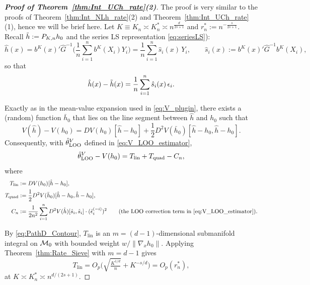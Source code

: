 \documentclass[12pt,american]{article}
\theoremstyle{definition}
\theoremstyle{plain}
\theoremstyle{definition}
\theoremstyle{plain}
\theoremstyle{plain}
\theoremstyle{plain}
\theoremstyle{plain}
\theoremstyle{plain}
\begin{document}
\begin{proof}[\textbf{Proof of Theorem~\ref{thm:Int_UCh_rate}(2)}]
The proof is very similar to the proofs of Theorem~\ref{thm:Int_NLh_rate}(2) and Theorem~\ref{thm:Int_UCh_rate}(1), hence we will be brief here.
Let $K\equiv K_n\asymp K_n^*\asymp n^{\frac{d}{2s+1}}$ and $r_n^*:=n^{-\frac{s}{2s+1}}$.
Recall $\tilde{h}:=P_{K,n}h_0$ and the series LS representation \eqref{eq:seriesLS}):
\begin{equation}\label{eq:LOO_V_series_rep}
\hat h(x)=b^K(x)'\hat G^{-1}\Big(\frac1n\sum_{i=1}^n b^K(X_i)Y_i\Big)=\frac1n\sum_{i=1}^n \hat s_i(x)\,Y_i,\qquad \hat s_i(x):=b^K(x)'\hat G^{-1}b^K(X_i),
\end{equation}
so that
\begin{equation}\label{eq:LOO_V_stoch_part}
\hat h(x)-\tilde{h}(x)=\frac1n\sum_{i=1}^n \hat s_i(x)\,\epsilon_i.
\end{equation}

\smallskip
Exactly as in the mean-value expansion used in \eqref{eq:V_plugin}, there exists a (random) function $\bar h_0$ that lies on the line segment between $\hat h$ and $h_0$ such that
\begin{equation}\label{eq:LOO_V_taylor}
V(\hat h)-V(h_0)=DV(h_0)[\hat h-h_0]+\frac12 D^2V(\bar h_0)[\hat h-h_0,\hat h-h_0].
\end{equation}
Consequently, with $\hat{\theta}_{\mathrm{LOO}}^{V}$ defined in \eqref{eq:V_LOO_estimator},
\begin{equation}\label{eq:LOO_V_main_decomp}
\hat{\theta}_{\mathrm{LOO}}^{V}-V(h_0)
=T_{\mathrm{lin}}+T_{\mathrm{quad}}-C_n,
\end{equation}
where
\begin{align*}
T_{\mathrm{lin}}&:=DV(h_0)[\hat h-h_0],\\
T_{\mathrm{quad}}&:=\frac12 D^2V(\bar h_0)[\hat h-h_0,\hat h-h_0],\\
C_n&:=\frac{1}{2n^2}\sum_{i=1}^n D^2V(\hat h)[\hat s_i,\hat s_i]\cdot (\hat{\epsilon}_i^{(-i)})^2\qquad\text{(the LOO correction term in \eqref{eq:V_LOO_estimator}).}
\end{align*}

\smallskip
By \eqref{eq:PathD_Contour}, $T_{\mathrm{lin}}$ is an $m=(d-1)$-dimensional submanifold integral on $\mathcal{M}_0$ with bounded weight $w/\|\nabla_x h_0\|$.
Applying Theorem~\ref{thm:Rate_Sieve} with $m=d-1$ gives
\begin{equation}\label{eq:LOO_V_Tlin_rate}
T_{\mathrm{lin}}=O_p\Big(\sqrt{\tfrac{K^{1/d}}{n}}+K^{-s/d}\Big)=O_p(r_n^*),
\end{equation}
at $K\asymp K_n^*\asymp n^{d/(2s+1)}$.


\end{proof}
\end{document}
